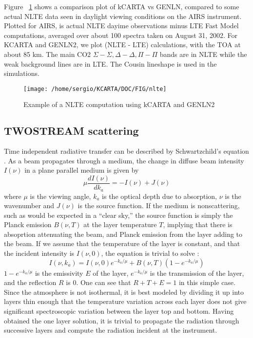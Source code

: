 \documentclass[12pt]{article}
\begin{document}
{{{{Figure ~\ref{fig:nlte} shows a comparison plot of kCARTA vs GENLN, compared 
to some actual NLTE data seen in daylight viewing conditions on the AIRS 
instrument. Plotted for AIRS, is actual NLTE dayime observations minus LTE 
Fast Model computations, averaged over about 100 spectra taken on 
August 31, 2002. For KCARTA and GENLN2, we plot (NLTE - LTE) 
calculations, with the TOA at about 85 km. The main CO2 $\Sigma-\Sigma, 
\Delta-\Delta, \Pi-\Pi$ bands are in NLTE while the weak background lines are 
in LTE. The Cousin lineshape is used in the simulations.

\begin{figure}
\texttt{[image: /home/sergio/KCARTA/DOC/FIG/nlte]}
  \caption{Example of a NLTE computation using kCARTA and GENLN2}
  \label{fig:nlte} 
\end{figure} 

\subsection{TWOSTREAM scattering}

Time independent radiative transfer can be described by Schwartzchild's 
equation \cite{lio:80,goo:89}. As a beam propagates through a medium, the 
change in diffuse beam intensity $I(\nu)$ in a plane parallel medium is 
given by 
\[
\mu \frac{dI(\nu)}{dk_{a}} = -I(\nu) + J(\nu)
\]
where $\mu$ is the viewing angle, $k_{a}$ is the optical depth due to 
absorption, $\nu$ is the wavenumber and $J(\nu)$ is the source function. If 
the medium is nonscattering, such as would be expected in a ``clear sky,'' 
the source function is simply the Planck emission $B(\nu,T)$ at the
layer temperature $T$, implying that there is absoprtion attenuating the beam,
and  Planck emission from the layer adding to the beam. If we assume that the
temperature of the layer is constant, and that the incident intensity is 
$I(\nu,0)$, the equation is trivial to solve : 
\[
I(\nu,k_{a}) = I(\nu,0) e^{-k_{a}/\mu} + B(\nu,T)(1 - e^{-k_{a}/\mu})
\]
$1-e^{-k_{a}/\mu}$ is the emissivity $E$ of the layer, $e^{-k_{a}/\mu}$ is 
the transmission of the layer, and the reflection $R$ is 0. One can see that 
$R+T+E = 1$ in this simple case. Since the atmosphere is not isothermal, it 
is best modeled by dividing it up into layers thin enough that the 
temperature variation across each layer does not give significant 
spectroscopic variation between the layer top and bottom. Having obtained 
the one layer solution, it is trivial to propagate the radiation through 
successive layers and compute the radiation incident at the instrument. 

}}}}
\end{document}
